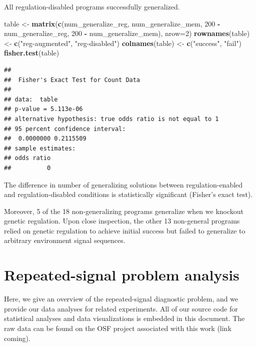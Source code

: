 \documentclass[
]{book}
\newenvironment{Shaded}{\begin{snugshade}}{\end{snugshade}}
\newcommand{\DataTypeTok}[1]{\textcolor[rgb]{0.13,0.29,0.53}{#1}}
\newcommand{\DecValTok}[1]{\textcolor[rgb]{0.00,0.00,0.81}{#1}}
\newcommand{\KeywordTok}[1]{\textcolor[rgb]{0.13,0.29,0.53}{\textbf{#1}}}
\newcommand{\NormalTok}[1]{#1}
\newcommand{\OperatorTok}[1]{\textcolor[rgb]{0.81,0.36,0.00}{\textbf{#1}}}
\newcommand{\StringTok}[1]{\textcolor[rgb]{0.31,0.60,0.02}{#1}}
\begin{document}
All regulation-disabled programs successfully generalized.

\begin{Shaded}
\begin{Highlighting}[]
\NormalTok{table \textless{}{-}}\StringTok{ }\KeywordTok{matrix}\NormalTok{(}\KeywordTok{c}\NormalTok{(num\_generalize\_reg,}
\NormalTok{                  num\_generalize\_mem,}
                  \DecValTok{200} \OperatorTok{{-}}\StringTok{ }\NormalTok{num\_generalize\_reg,}
                  \DecValTok{200} \OperatorTok{{-}}\StringTok{ }\NormalTok{num\_generalize\_mem),}
                \DataTypeTok{nrow=}\DecValTok{2}\NormalTok{)}
\KeywordTok{rownames}\NormalTok{(table) \textless{}{-}}\StringTok{ }\KeywordTok{c}\NormalTok{(}\StringTok{"reg{-}augmented"}\NormalTok{, }\StringTok{"reg{-}disabled"}\NormalTok{)}
\KeywordTok{colnames}\NormalTok{(table) \textless{}{-}}\StringTok{ }\KeywordTok{c}\NormalTok{(}\StringTok{"success"}\NormalTok{, }\StringTok{"fail"}\NormalTok{)}
\KeywordTok{fisher.test}\NormalTok{(table)}
\end{Highlighting}
\end{Shaded}

\begin{verbatim}
## 
##  Fisher's Exact Test for Count Data
## 
## data:  table
## p-value = 5.113e-06
## alternative hypothesis: true odds ratio is not equal to 1
## 95 percent confidence interval:
##  0.0000000 0.2115509
## sample estimates:
## odds ratio 
##          0
\end{verbatim}

The difference in number of generalizing solutions between regulation-enabled and regulation-disabled conditions is statistically significant (Fisher's exact test).

Moreover, 5 of the 18 non-generalizing programs generalize when we knockout genetic regulation.
Upon close inspection, the other 13 non-general programs relied on genetic regulation to achieve initial success but failed to generalize to arbitrary environment signal sequences.

\hypertarget{repeated-signal-problem-analysis}{%
\chapter{Repeated-signal problem analysis}\label{repeated-signal-problem-analysis}}

Here, we give an overview of the repeated-signal diagnostic problem, and we provide our data analyses for related experiments.
All of our source code for statistical analyses and data visualizations is embedded in this document.
The raw data can be found on the OSF project associated with this work (link coming).
\end{document}
